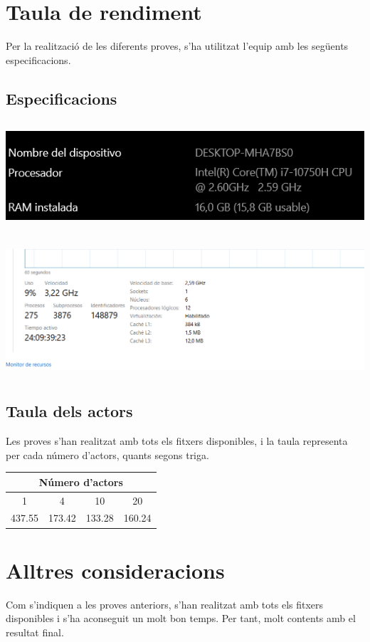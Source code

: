 \documentclass[11pt,a4paper]{article}
\begin{document}
\section{Taula de rendiment}

	Per la realització de les diferents proves, s'ha utilitzat l'equip amb les següents especificacions.

	\subsection{Especificacions}
		
		\begin{center}
			\includegraphics[height=4cm]{captures/especificacionsEquip/especificacions1.png}
		\end{center}
		
		\begin{center}
			\includegraphics[height=5cm]{captures/especificacionsEquip/especificacions2.png}
		\end{center}
		
	\subsection{Taula dels actors}
	
		Les proves s'han realitzat amb tots els fitxers disponibles, i la taula representa per cada número d'actors, quants segons triga.
	
		\begin{table}[h!]
			\centering
			\begin{tabular}{||c c c c||} 
			 \hline
			 \multicolumn{4}{|c|}{Número d'actors} \\
			 \hline
			 1 & 4 & 10 & 20 \\ [0.5ex] 
			 \hline
			  437.55 & 173.42 & 133.28 & 160.24 \\ [1ex] 
			 \hline
			\end{tabular}
		\end{table}

\section{Alltres consideracions}

Com s'indiquen a les proves anteriors, s'han realitzat amb tots els fitxers disponibles i s'ha aconseguit un molt bon temps. Per tant, molt contents amb el resultat final.
\end{document}
